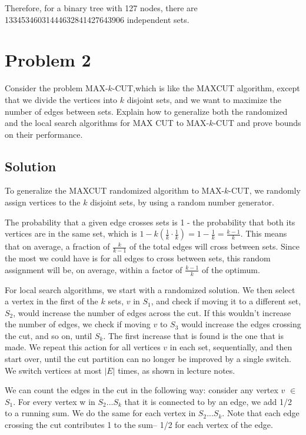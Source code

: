 \documentclass[11pt]{article}
\begin{document}
Therefore, for a binary tree with 127 nodes, there are 13345346031444632841427643906 independent sets.


\section{Problem 2}
Consider the problem MAX-$k$-CUT,which is like the MAXCUT algorithm, except that we divide the vertices into $k$ disjoint sets, and we want to maximize the number of edges between sets. Explain how to generalize both the randomized and the local search algorithms for MAX CUT to MAX-$k$-CUT and prove bounds on their performance.
\subsection{Solution}
To generalize the MAXCUT randomized algorithm to MAX-$k$-CUT, we randomly assign vertices to the $k$ disjoint sets, by using a random number generator. 

The probability that a given edge crosses sets is 1 - the probability that both its vertices are in the same set, which is $1- k(\frac{1}{k}\cdot\frac{1}{k})= 1 - \frac{1}{k} = \frac{k-1}{k}$. This means that on average, a fraction of $\frac{k}{k-1}$ of the total edges will cross between sets. Since the most we could have is for all edges to cross between sets, this random assignment will be, on average, within a factor of $\frac{k-1}{k}$ of the optimum.

For local search algorithms, we start with a randomized solution. We then select a vertex in the first of the $k$ sets, $v$ in $S_1$, and check if moving it to a different set, $S_2$, would increase the number of edges across the cut. If this wouldn't increase the number of edges, we check if moving $v$ to $S_3$ would increase the edges crossing the cut, and so on, until $S_k$. The first increase that is found is the one that is made. We repeat this action for all vertices $v$ in each set, sequentially, and then start over, until the cut partition can no longer be improved by a single switch. We switch vertices at most $|E|$ times, as shown in lecture notes. 

We can count the edges in the cut in the following way: consider any vertex $v$ $\in$ $S_1$. For every vertex w in $S_2...S_k$ that it is connected to by an edge, we add 1/2 to a running sum. We do the same for each vertex in $S_2...S_k$. Note that each edge crossing the cut contributes 1 to the sum– 1/2 for each vertex of the edge.
\end{document}
